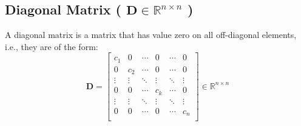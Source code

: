 
\subsection{Diagonal Matrix ( $\mathbf{D} \in \mathbb{R}^{n\times n}$ ) \cite{mfml-1}}\label{Diagonal Matrix}

A diagonal matrix is a matrix that has value zero on all off-diagonal elements, i.e., they are of the form:
\[
    \renewcommand{\arraystretch}{0.6}
    \mathbf{D} = \begin{bmatrix}
        c_1 & 0 & \cdots & 0 & \cdots & 0 \\
        0 & c_2 & \cdots & 0 & \cdots & 0 \\
        \vdots & \vdots & \ddots & \vdots & \ddots & \vdots \\
        0 & 0 & \cdots & c_k & \cdots & 0 \\
        \vdots & \vdots & \ddots & \vdots & \ddots & \vdots \\
        0 & 0 & \cdots & 0 & \cdots & c_n \\
    \end{bmatrix} \in \mathbb{R}^{n\times n}
\]


